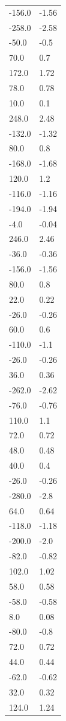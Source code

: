 \begin{longtable}{ll}
-156.0 & -1.56 \\
-258.0 & -2.58 \\
-50.0 & -0.5 \\
70.0 & 0.7 \\
172.0 & 1.72 \\
78.0 & 0.78 \\
10.0 & 0.1 \\
248.0 & 2.48 \\
-132.0 & -1.32 \\
80.0 & 0.8 \\
-168.0 & -1.68 \\
120.0 & 1.2 \\
-116.0 & -1.16 \\
-194.0 & -1.94 \\
-4.0 & -0.04 \\
246.0 & 2.46 \\
-36.0 & -0.36 \\
-156.0 & -1.56 \\
80.0 & 0.8 \\
22.0 & 0.22 \\
-26.0 & -0.26 \\
60.0 & 0.6 \\
-110.0 & -1.1 \\
-26.0 & -0.26 \\
36.0 & 0.36 \\
-262.0 & -2.62 \\
-76.0 & -0.76 \\
110.0 & 1.1 \\
72.0 & 0.72 \\
48.0 & 0.48 \\
40.0 & 0.4 \\
-26.0 & -0.26 \\
-280.0 & -2.8 \\
64.0 & 0.64 \\
-118.0 & -1.18 \\
-200.0 & -2.0 \\
-82.0 & -0.82 \\
102.0 & 1.02 \\
58.0 & 0.58 \\
-58.0 & -0.58 \\
8.0 & 0.08 \\
-80.0 & -0.8 \\
72.0 & 0.72 \\
44.0 & 0.44 \\
-62.0 & -0.62 \\
32.0 & 0.32 \\
124.0 & 1.24 \\

\end{longtable}
